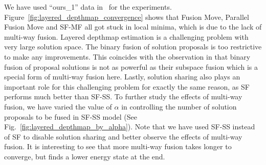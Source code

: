 
\noindent We have used ``ours\_1'' data in~\cite{layered_depthmap} for
the experiments. Figure~\ref{fig:layered_depthmap_convergence} shows
that Fusion Move, Parallel Fusion Move and SF-MF all got stuck in local
minima, which is due to the lack of multi-way fusion.  Layered depthmap
estimation is a challenging problem with very large solution space. The
binary fusion of solution proposals is too restrictive to make any
improvements.  This coincides with the observation in
\cite{layered_depthmap} that binary fusion of proposal solutions is not
as powerful as their subspace fusion which is a special form of
multi-way fusion here. Lastly, solution sharing also plays an important
role for this challenging problem for exactly the same reason, as SF
performs much better than SF-SS.
%
To further study the effects of multi-way fusion, we have varied the
value of $\alpha$ in controlling the number of solution proposals to be
fused in SF-SS model (See
Fig.~\ref{fig:layered_depthmap_by_alpha}). Note that we have used SF-SS
instead of SF to disable solution sharing and better observe the effects
of multi-way fusion.
It is interesting to see that more multi-way fusion takes longer to
converge, but finds a lower energy state at the end.

